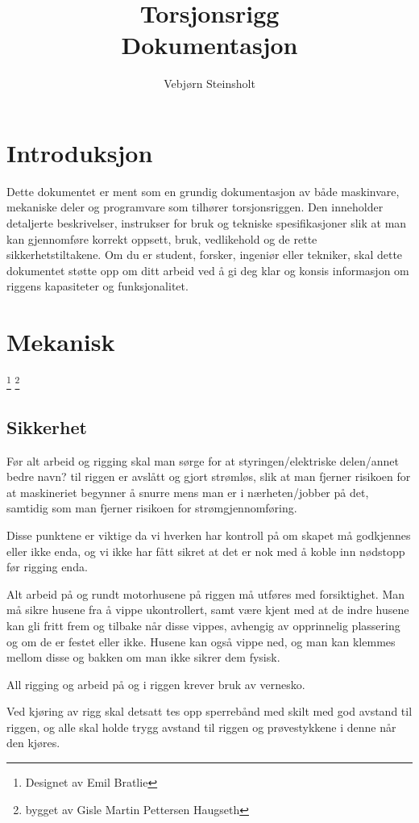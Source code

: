 \documentclass{ol-softwaremanual}
\title{Torsjonsrigg\\Dokumentasjon}
\author{Vebjørn Steinsholt}
\begin{document}
\maketitle

\tableofcontents
\listoffigures
\lstlistoflistings
\newpage

\section{Introduksjon}

Dette dokumentet er ment som en grundig dokumentasjon av både maskinvare, mekaniske deler og programvare som tilhører torsjonsriggen. Den inneholder detaljerte beskrivelser, instrukser for bruk og tekniske spesifikasjoner slik at man kan gjennomføre korrekt oppsett, bruk, vedlikehold og de rette sikkerhetstiltakene. Om du er student, forsker, ingeniør eller tekniker, skal dette dokumentet støtte opp om ditt arbeid ved å gi deg klar og konsis informasjon om riggens kapasiteter og funksjonalitet.
\section{Mekanisk}
\footnote{Designet av Emil Bratlie} \footnote{bygget av Gisle Martin Pettersen Haugseth}
\subsection{Sikkerhet}
Før alt arbeid og rigging skal man sørge for at styringen/elektriske delen/annet bedre navn? til riggen er avslått og gjort strømløs, slik at man fjerner risikoen for at maskineriet begynner å snurre mens man er i nærheten/jobber på det, samtidig som man fjerner risikoen for strømgjennomføring.

Disse punktene er viktige da vi hverken har kontroll på om skapet må godkjennes eller ikke enda, og vi ikke har fått sikret at det er nok med å koble inn nødstopp før rigging enda.

Alt arbeid på og rundt motorhusene på riggen må utføres med forsiktighet. Man må sikre husene fra å vippe ukontrollert, samt være kjent med at de indre husene kan gli fritt frem og tilbake når disse vippes, avhengig av opprinnelig plassering og om de er festet eller ikke. Husene kan også vippe ned, og man kan klemmes mellom disse og bakken om man ikke sikrer dem fysisk.

All rigging og arbeid på og i riggen krever bruk av vernesko.

Ved kjøring av rigg skal detsatt tes opp sperrebånd med skilt med god avstand til riggen, og alle skal holde trygg avstand til riggen og prøvestykkene i denne når den kjøres.
\end{document}
